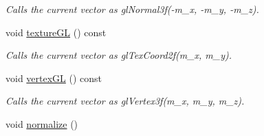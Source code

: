 \begin{DoxyCompactItemize}
\begin{DoxyCompactList}\small\item\em Calls the current vector as glNormal3f(-\/m\_\-x, -\/m\_\-y, -\/m\_\-z). \item\end{DoxyCompactList}\item 
\hypertarget{classVec4_ac6ff2b58916c17fd5bc29b4b53a4629c}{
void \hyperlink{classVec4_ac6ff2b58916c17fd5bc29b4b53a4629c}{textureGL} () const }
\label{classVec4_ac6ff2b58916c17fd5bc29b4b53a4629c}

\begin{DoxyCompactList}\small\item\em Calls the current vector as glTexCoord2f(m\_\-x, m\_\-y). \item\end{DoxyCompactList}\item 
\hypertarget{classVec4_ae637ea15f081d10860629ec70f95929a}{
void \hyperlink{classVec4_ae637ea15f081d10860629ec70f95929a}{vertexGL} () const }
\label{classVec4_ae637ea15f081d10860629ec70f95929a}

\begin{DoxyCompactList}\small\item\em Calls the current vector as glVertex3f(m\_\-x, m\_\-y, m\_\-z). \item\end{DoxyCompactList}\item 
\hypertarget{classVec4_aecf9d5a3003c2a443098b4d80bc9dea6}{
void \hyperlink{classVec4_aecf9d5a3003c2a443098b4d80bc9dea6}{normalize} ()}
\label{classVec4_aecf9d5a3003c2a443098b4d80bc9dea6}


\end{DoxyCompactItemize}
